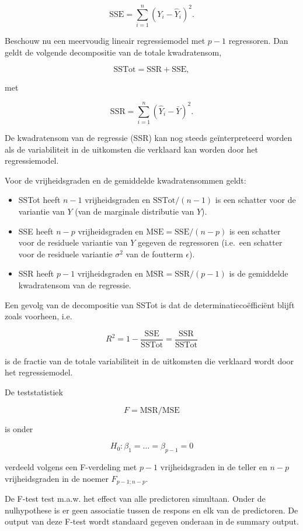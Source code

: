 \documentclass[
  12pt,dutch,coursenotes]{book}
\providecommand{\tightlist}{%
  \setlength{\itemsep}{0pt}\setlength{\parskip}{0pt}}
\theoremstyle{definition}
\theoremstyle{definition}
\theoremstyle{definition}
\theoremstyle{definition}
\theoremstyle{remark}
\begin{document}
\[
  \text{SSE} = \sum_{i=1}^n (Y_i-\hat{Y}_i)^2.
\]

Beschouw nu een meervoudig lineair regressiemodel met \(p-1\) regressoren. Dan geldt de volgende decompositie van de totale kwadratensom,

\[
  \text{SSTot} = \text{SSR} + \text{SSE} ,
\]

met

\[
  \text{SSR} = \sum_{i=1}^n (\hat{Y}_i-\bar{Y})^2.
\]

De kwadratensom van de regressie (SSR) kan nog steeds geïnterpreteerd worden als de variabiliteit in de uitkomsten die verklaard kan worden door het regressiemodel.

Voor de vrijheidsgraden en de gemiddelde kwadratensommen geldt:

\begin{itemize}
\tightlist
\item
  SSTot heeft \(n-1\) vrijheidsgraden en \(\text{SSTot}/(n-1)\) is een schatter voor de variantie van \(Y\) (van de marginale distributie van \(Y\)).
\item
  SSE heeft \(n-p\) vrijheidsgraden en \(\text{MSE}=\text{SSE}/(n-p)\) is een schatter voor de residuele variantie van \(Y\) gegeven de regressoren (i.e.~een schatter voor de residuele variantie \(\sigma^2\) van de foutterm \(\epsilon\)).
\item
  SSR heeft \(p-1\) vrijheidsgraden en \(\text{MSR}=\text{SSR}/(p-1)\) is de gemiddelde kwadratensom van de regressie.
\end{itemize}

Een gevolg van de decompositie van SSTot is dat de determinatiecoëfficiënt blijft zoals voorheen, i.e.

\[
  R^2 = 1-\frac{\text{SSE}}{\text{SSTot}} = \frac{\text{SSR}}{\text{SSTot}}
\]

is de fractie van de totale variabiliteit in de uitkomsten die verklaard wordt door het regressiemodel.

De teststatistiek

\[
F=\text{MSR}/\text{MSE}
\]

is onder

\[H_0:\beta_1=\ldots=\beta_{p-1}=0\]

verdeeld volgens een F-verdeling met \(p-1\) vrijheidsgraden in de teller en \(n-p\) vrijheidsgraden in de noemer \(F_{p-1;n-p}\).

De F-test test m.a.w. het effect van alle predictoren simultaan. Onder de nulhypothese is er geen associatie tussen de respons en elk van de predictoren. De output van deze F-test wordt standaard gegeven onderaan in de summary output.
\end{document}
